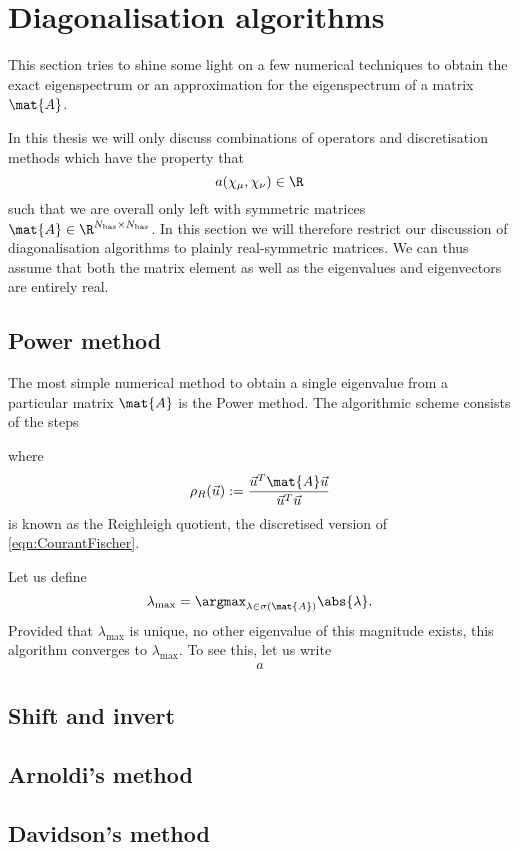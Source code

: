 \section{Diagonalisation algorithms}

This section tries to shine some light on a few numerical techniques
to obtain the exact eigenspectrum or an approximation for the eigenspectrum
of a matrix $\mat{A}$.

In this thesis we will only discuss combinations of operators
and discretisation methods which have the property
that
\[ a(\chi_\mu, \chi_\nu) \in \R \]
such that we are overall only left with symmetric matrices
$\mat{A} \in \R^{\Nbas \times \Nbas}$.
In this section we will therefore restrict our discussion
of diagonalisation algorithms to plainly real-symmetric matrices.
We can thus assume that both the matrix element
as well as the eigenvalues and eigenvectors are entirely real.

\subsection{Power method}
The most simple numerical method to obtain
a single eigenvalue from a particular matrix $\mat{A}$
is the Power method.
The algorithmic scheme consists of the steps


where
\[ \rho_R(\vec{u}) := \frac{\vec{u}^T \mat{A} \vec{u}}{\vec{u}^T \vec{u}} \]
is known as the Reighleigh quotient,
the discretised version of \eqref{eqn:CourantFischer}.

Let us define
\[ \lambda_\text{max} = \argmax_{\lambda \in \sigma(\mat{A})} \abs{\lambda}. \]
Provided that $\lambda_\text{max}$ is unique,
\ie no other eigenvalue of this magnitude exists,
this algorithm converges to $\lambda_\text{max}$.
To see this, let us write
\begin{align}
	a
\end{align}




\subsection{Shift and invert}

\subsection{Arnoldi's method}

\subsection{Davidson's method}
